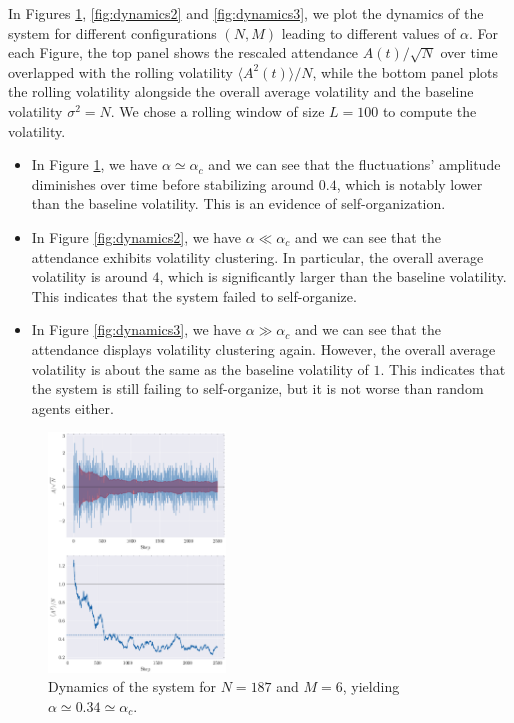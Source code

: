\documentclass[a4paper, amsfonts, amssymb, amsmath, reprint, showkeys, nofootinbib, twoside]{revtex4-1}
\begin{document}
In Figures \ref{fig:dynamics1}, \ref{fig:dynamics2} and \ref{fig:dynamics3}, we plot the dynamics of the system for different configurations $(N,M)$ leading to different values of $\alpha$. For each Figure, the top panel shows the rescaled attendance $A(t) / \sqrt{N}$ over time overlapped with the rolling volatility $\langle A^2(t) \rangle / N$, while the bottom panel plots the rolling volatility alongside the overall average volatility and the baseline volatility $\sigma^2 = N$. We chose a rolling window of size $L=100$ to compute the volatility.
\begin{itemize}
    \item In Figure \ref{fig:dynamics1}, we have $\alpha \simeq \alpha_c$ and we can see that the fluctuations' amplitude diminishes over time before stabilizing around $0.4$, which is notably lower than the baseline volatility. This is an evidence of self-organization.
    \item In Figure \ref{fig:dynamics2}, we have $\alpha \ll \alpha_c$ and we can see that the attendance exhibits volatility clustering. In particular, the overall average volatility is around $4$, which is significantly larger than the baseline volatility. This indicates that the system failed to self-organize.
    \item In Figure \ref{fig:dynamics3}, we have $\alpha \gg \alpha_c$ and we can see that the attendance displays volatility clustering again. However, the overall average volatility is about the same as the baseline volatility of $1$. This indicates that the system is still failing to self-organize, but it is not worse than random agents either.
\end{itemize}

\begin{figure}[H]
    \centering
    \includegraphics[width=0.42\textwidth]{figures/M6_N187.png}
    \caption{Dynamics of the system for $N=187$ and $M=6$, yielding $\alpha \simeq 0.34 \simeq \alpha_c$.}
    \label{fig:dynamics1}
\end{figure}
\end{document}
